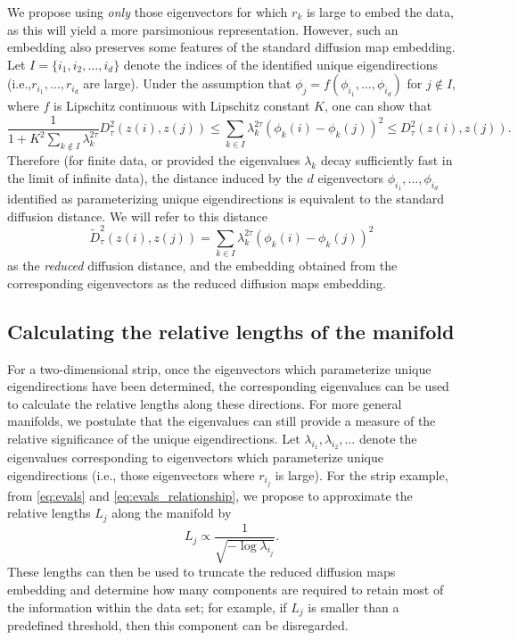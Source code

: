 We propose using {\em only} those eigenvectors for which $r_k$ is large to embed the data, as this will yield a more parsimonious representation.
%
However, such an embedding also preserves some features of the standard diffusion map embedding.
%
Let $I = \{i_1, i_2, \dots, i_d \}$ denote the indices of the identified unique eigendirections (i.e.,$r_{i_1}, \dots, r_{i_d}$ are large).
%
Under the assumption that $\phi_j = f \left( \phi_{i_1}, \dots, \phi_{i_d} \right)$ for $j \not\in I$, where $f$ is Lipschitz continuous with Lipschitz constant $K$, one can show that
\begin{equation}
\frac{1}{1+K^2 \sum_{k \not\in I} \lambda_k^{2\tau}} D^2_\tau(z(i), z(j)) \le \sum_{k \in I} \lambda_k^{2 \tau} \left( \phi_k(i) - \phi_k(j)  \right)^2 \le D^2_\tau(z(i), z(j)).
\end{equation}
%
Therefore (for finite data, or provided the eigenvalues $\lambda_k$ decay sufficiently fast in the limit of infinite data), the distance induced by the $d$ eigenvectors $\phi_{i_1}, \dots, \phi_{i_d}$ identified as parameterizing unique eigendirections is equivalent to the standard diffusion distance.
%
We will refer to this distance
\begin{equation}
\tilde{D}^2_\tau(z(i), z(j)) = \sum_{k \in I} \lambda_k^{2 \tau} \left( \phi_k(i) - \phi_k(j)  \right)^2
\end{equation}
%
as the {\em reduced} diffusion distance, and the embedding obtained from the corresponding eigenvectors as the reduced diffusion maps embedding.
%

\subsection{Calculating the relative lengths of the manifold} \label{sec:relative_lengths}

For a two-dimensional strip, once the eigenvectors which parameterize unique eigendirections have been determined, the corresponding eigenvalues can be used to calculate the relative lengths along these directions.
%
For more general manifolds, we postulate that the eigenvalues can still provide a measure of the relative significance of the unique eigendirections.
%
Let $\lambda_{i_1}, \lambda_{i_2}, \dots$ denote the eigenvalues corresponding to eigenvectors which parameterize unique eigendirections (i.e., those eigenvectors where $r_{i_j}$ is large).
%
For the strip example, from \eqref{eq:evals} and \eqref{eq:evals_relationship}, we propose to approximate the relative lengths $L_j$  along the manifold by
\begin{equation} \label{eq:est_lengths}
L_j \propto \frac{1}{\sqrt{-\log \lambda_{i_j}}}.
\end{equation}
%
These lengths can then be used to truncate the reduced diffusion maps embedding and determine how many components are required to retain most of the information within the data set;
for example, if $L_j$ is smaller than a predefined threshold, then this component can be disregarded.


